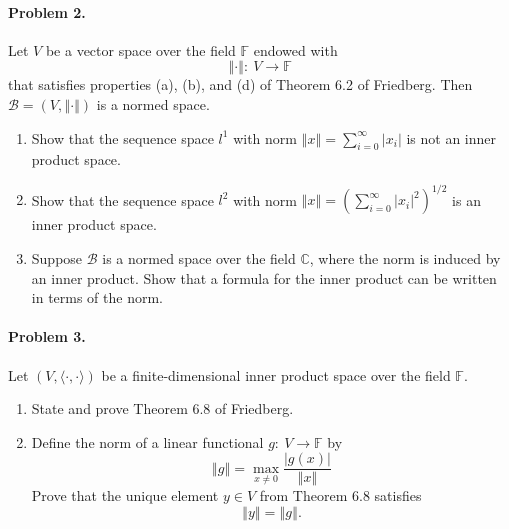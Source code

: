 \documentclass{article}
\begin{document}
\paragraph*{Problem 2.} Let $V$ be a vector space over the field $\mathbb{F}$ endowed with 
\[
\left\Vert\cdot\right\Vert\colon~V\rightarrow\mathbb{F}
\]
that satisfies properties (a), (b), and (d) of Theorem 6.2 of Friedberg. Then $\mathcal{B}=(V,\left\Vert\cdot\right\Vert)$ is a normed space. 
\begin{enumerate}
\item	Show that the sequence space $l^{1}$ with norm $\left\Vert x\right\Vert=\sum_{i=0}^{\infty}|x_{i}|$ is not an inner product space.
\item	Show that the sequence space $l^{2}$ with norm $\left\Vert x\right\Vert=\left(\sum_{i=0}^{\infty}|x_{i}|^{2}\right)^{1/2}$ is an inner product space. 
\item	Suppose $\mathcal{B}$ is a normed space over the field $\mathbb{C}$, where the norm is induced by an inner product. Show that a formula for the inner product can be written in terms of the norm. 
\end{enumerate}

\paragraph*{Problem 3.} Let $(V,\langle\cdot,\cdot\rangle)$ be a finite-dimensional inner product space over the field $\mathbb{F}$. 
\begin{enumerate}
\item	State and prove Theorem 6.8 of Friedberg.
\item	Define the norm of a linear functional $g\colon~V\rightarrow\mathbb{F}$ by
\[
\left\Vert g\right\Vert = \max_{x\neq 0}\frac{|g(x)|}{\left\Vert x\right\Vert}
\]
Prove that the unique element $y\in V$ from Theorem 6.8 satisfies 
\[
\left\Vert y\right\Vert = \left\Vert g\right\Vert.
\]
\end{enumerate}
\end{document}
